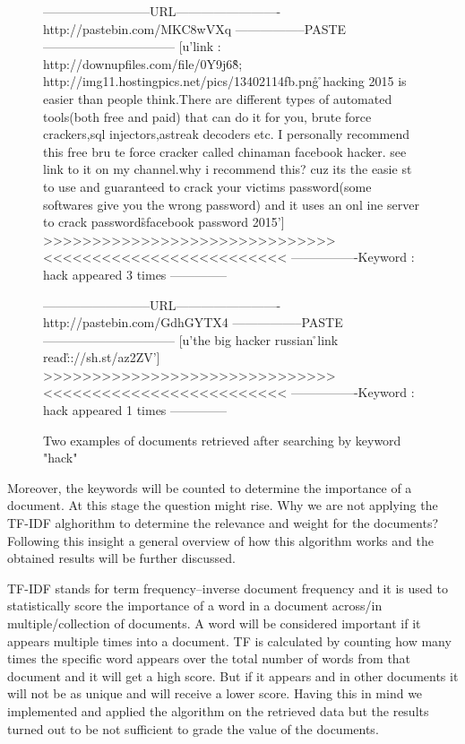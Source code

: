 \documentclass[12pt]{article}
\begin{document}
\begin{figure}[h!]
\begin{spverbatim}
--------------------------URL-------------------------
http://pastebin.com/MKC8wVXq
-----------------PASTE--------------------------------
[u'link : http://downupfiles.com/file/0Y9j68\r\n\r\nscreenshoot ; http://img11.hostingpics.net/pics/13402114fb.png\r\n
\r\nFacebook hacking 2015 is easier than people think.There are different types of automated tools(both free and paid)
 that can do it for you, brute force crackers,sql injectors,astreak decoders etc. I personally recommend this free bru
te force cracker called chinaman facebook hacker. see link to it on my channel.why i recommend this? cuz its the easie
st to use and guaranteed to crack your victims password(some softwares give you the wrong password) and it uses an onl
ine server to crack passwords\r\nhack facebook password 2015']
>>>>>>>>>>>>>>>>>>>>>>>>>>>>>><<<<<<<<<<<<<<<<<<<<<<<<<
----------------Keyword :  hack   appeared  3  times --------------


--------------------------URL-------------------------
http://pastebin.com/GdhGYTX4
-----------------PASTE--------------------------------
[u'the big hacker russian \r\nthe link read:\r\nhttp://sh.st/az2ZV']
>>>>>>>>>>>>>>>>>>>>>>>>>>>>>><<<<<<<<<<<<<<<<<<<<<<<<<
----------------Keyword :  hack   appeared  1  times --------------
\end{spverbatim}
\captionsetup{font=small}
\caption{ Two examples of documents retrieved after searching by keyword "hack" }
\end{figure}
Moreover, the keywords will be counted to determine the importance of a document. At this stage the question might rise. Why we are not applying the TF-IDF alghorithm to determine the relevance and weight for the documents? 
Following this insight a general overview of how this algorithm works and the obtained results will be further discussed. 

TF-IDF \cite{tf-idf} stands for term frequency–inverse document frequency and it is used to statistically score the importance of a word in a document across/in multiple/collection of documents. A word will be considered important if it appears multiple times into a document. TF is calculated by counting how many times the specific word appears over the total number of words from that document and it will get a high score. But if it appears and in other documents it will not be as unique and will receive a lower score. Having this in mind we implemented and applied the algorithm  on the retrieved data but the results turned out to be not sufficient to grade the value of the documents.
\end{document}
